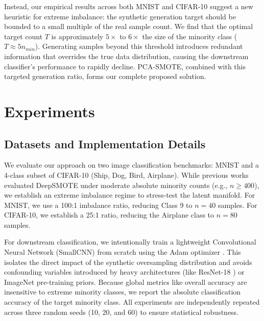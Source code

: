 \documentclass[5p,times]{elsarticle}
\begin{document}
Instead, our empirical results across both MNIST and CIFAR-10 suggest a new heuristic for extreme imbalance: the synthetic generation target should be bounded to a small multiple of the real sample count. We find that the optimal target count $T$ is approximately $5\times$ to $6\times$ the size of the minority class ($T \approx 5n_{min}$). Generating samples beyond this threshold introduces redundant information that overrides the true data distribution, causing the downstream classifier's performance to rapidly decline. PCA-SMOTE, combined with this targeted generation ratio, forms our complete proposed solution.

\section{Experiments}
\label{sec:experiments}

\subsection{Datasets and Implementation Details}
\label{subsec:impl}
We evaluate our approach on two image classification benchmarks: MNIST \citep{lecun1998gradient} and a 4-class subset of CIFAR-10 \citep{krizhevsky2009learning} (Ship, Dog, Bird, Airplane). While previous works evaluated DeepSMOTE under moderate absolute minority counts (e.g., $n \ge 400$), we establish an extreme imbalance regime to stress-test the latent manifold. For MNIST, we use a 100:1 imbalance ratio, reducing Class 9 to $n=40$ samples. For CIFAR-10, we establish a 25:1 ratio, reducing the Airplane class to $n=80$ samples. 

For downstream classification, we intentionally train a lightweight Convolutional Neural Network (SmallCNN) \citep{lecun1989backpropagation} from scratch using the Adam optimizer \citep{kingma2014adam}. This isolates the direct impact of the synthetic oversampling distribution and avoids confounding variables introduced by heavy architectures (like ResNet-18 \citep{he2016deep}) or ImageNet pre-training priors. Because global metrics like overall accuracy are insensitive to extreme minority classes, we report the absolute classification accuracy of the target minority class. All experiments are independently repeated across three random seeds (10, 20, and 60) to ensure statistical robustness.
\end{document}
